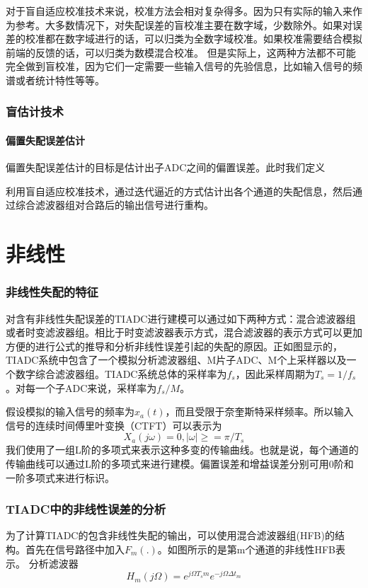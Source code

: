 对于盲自适应校准技术来说，校准方法会相对复杂得多。因为只有实际的输入来作为参考。大多数情况下，对失配误差的盲校准主要在数字域，少数除外。如果对误差的校准都在数字域进行的话，可以归类为全数字域校准。如果校准需要结合模拟前端的反馈的话，可以归类为数模混合校准。
但是实际上，这两种方法都不可能完全做到盲校准，因为它们一定需要一些输入信号的先验信息，比如输入信号的频谱或者统计特性等等。\par
\subsection{盲估计技术}
\subsubsection{偏置失配误差估计}
偏置失配误差估计的目标是估计出子ADC之间的偏置误差。此时我们定义

利用盲自适应校准技术，通过迭代逼近的方式估计出各个通道的失配信息，然后通过综合滤波器组对合路后的输出信号进行重构。





\chapter{非线性}
\subsection{非线性失配的特征}
对含有非线性失配误差的TIADC进行建模可以通过如下两种方式：混合滤波器组或者时变滤波器组。相比于时变滤波器表示方式，混合滤波器的表示方式可以更加方便的进行公式的推导和分析非线性误差引起的失配的原因。正如图显示的，TIADC系统中包含了一个模拟分析滤波器组、M片子ADC、M个上采样器以及一个数字综合滤波器组。TIADC系统总体的采样率为$f_s$，因此采样周期为$T_s=1/f_s$。对每一个子ADC来说，采样率为$f_s/M$。
\par
假设模拟的输入信号的频率为$x_a(t)$，而且受限于奈奎斯特采样频率。所以输入信号的连续时间傅里叶变换（CTFT）可以表示为
\begin{equation}
	X_a(j\omega)=0,\left| \omega \right|\geq=\pi/T_s
\end{equation}
我们使用了一组L阶的多项式来表示这种多变的传输曲线。也就是说，每个通道的传输曲线可以通过L阶的多项式来进行建模。偏置误差和增益误差分别可用0阶和一阶多项式来进行标识。

\subsection{TIADC中的非线性误差的分析}
为了计算TIADC的包含非线性失配的输出，可以使用混合滤波器组(HFB)的结构。首先在信号路径中加入$F_m( . )$。如图所示的是第m个通道的非线性HFB表示。
分析滤波器
\begin{equation}
\label{equ:Hm}
H_m(j\Omega)={e^{j\Omega {T_s}m}}{e^{ - j\Omega \Delta {t_m}}}
\end{equation}


